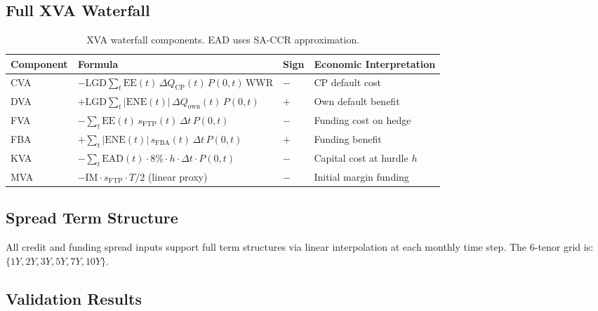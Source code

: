 \documentclass[11pt,a4paper]{article}
\begin{document}
\subsection{Full XVA Waterfall}

\begin{table}[H]
\centering
\begin{tabular}{llll}
\toprule
\textbf{Component} & \textbf{Formula} & \textbf{Sign} & \textbf{Economic Interpretation} \\
\midrule
CVA & $-\text{LGD}\sum_t \text{EE}(t)\,\Delta Q_\text{CP}(t)\,P(0,t)\,\text{WWR}$
    & $-$ & CP default cost \\[0.3em]
DVA & $+\text{LGD}\sum_t |\text{ENE}(t)|\,\Delta Q_\text{own}(t)\,P(0,t)$
    & $+$ & Own default benefit \\[0.3em]
FVA & $-\sum_t \text{EE}(t)\,s_\text{FTP}(t)\,\Delta t\,P(0,t)$
    & $-$ & Funding cost on hedge \\[0.3em]
FBA & $+\sum_t |\text{ENE}(t)|\,s_\text{FBA}(t)\,\Delta t\,P(0,t)$
    & $+$ & Funding benefit \\[0.3em]
KVA & $-\sum_t \text{EAD}(t)\cdot 8\%\cdot h\cdot\Delta t\cdot P(0,t)$
    & $-$ & Capital cost at hurdle $h$ \\[0.3em]
MVA & $-\text{IM}\cdot s_\text{FTP}\cdot T/2$ (linear proxy)
    & $-$ & Initial margin funding \\
\bottomrule
\end{tabular}
\caption{XVA waterfall components. EAD uses SA-CCR approximation.}
\end{table}

\subsection{Spread Term Structure}

All credit and funding spread inputs support full term structures via linear
interpolation at each monthly time step. The 6-tenor grid is:
$\{1Y, 2Y, 3Y, 5Y, 7Y, 10Y\}$.

\subsection{Validation Results}
\end{document}
